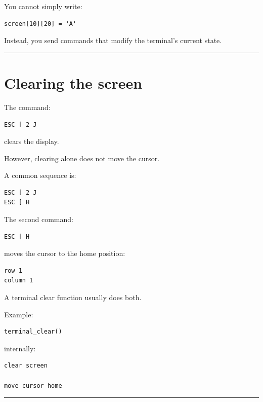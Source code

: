 \documentclass[
  oneside,
  openany]{book}
\begin{document}
You cannot simply write:

\begin{verbatim}
screen[10][20] = 'A'
\end{verbatim}

Instead, you send commands that modify the terminal's current state.

\begin{center}\rule{0.5\linewidth}{0.5pt}\end{center}

\hypertarget{clearing-the-screen}{%
\section{Clearing the screen}\label{clearing-the-screen}}

The command:

\begin{verbatim}
ESC [ 2 J
\end{verbatim}

clears the display.

However, clearing alone does not move the cursor.

A common sequence is:

\begin{verbatim}
ESC [ 2 J
ESC [ H
\end{verbatim}

The second command:

\begin{verbatim}
ESC [ H
\end{verbatim}

moves the cursor to the home position:

\begin{verbatim}
row 1
column 1
\end{verbatim}

A terminal clear function usually does both.

Example:

\begin{verbatim}
terminal_clear()
\end{verbatim}

internally:

\begin{verbatim}
clear screen

move cursor home
\end{verbatim}

\begin{center}\rule{0.5\linewidth}{0.5pt}\end{center}
\end{document}
